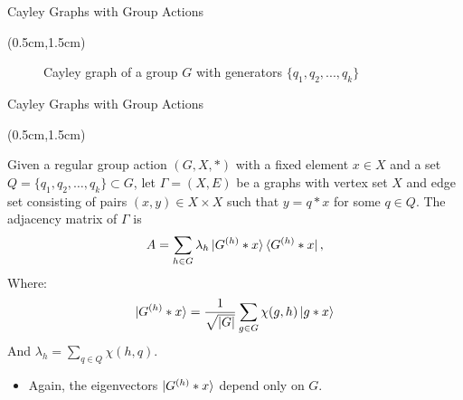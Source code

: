 \documentclass{beamer}
\theoremstyle{definition}
\begin{document}
\begin{frame}{Cayley Graphs with Group Actions}
    \begin{textblock*}{12cm}(0.5cm,1.5cm)


        \begin{figure}[H]
            \centering
            \caption{Cayley graph of a group $G$ with generators $\{q_1, q_2, ... , q_k\}$}

            \label{fig:group-action-orbit}
        \end{figure}
        
    
    \end{textblock*}
\end{frame}






\begin{frame}{Cayley Graphs with Group Actions}
    \begin{textblock*}{12cm}(0.5cm,1.5cm)

    
    Given a regular group action $(G, X, *)$ with a fixed element $x \in X$ and a set  $Q = \{q_1, q_2, \dots, q_k\} \subset G$, let $\Gamma = (X, E)$ be a graphs with vertex set $X$ and edge set consisting of pairs $(x, y) \in X \times X$ such that $y = q * x$ for some $q \in Q$. The adjacency matrix of $\Gamma$ is
    \[
    A = \sum_{h \in G} \lambda_h \ket{G^{(h)} * x} \bra{G^{(h)} * x}, 
    \]
    Where:
    \[
        \ket{G^{(h)} * x} = \frac{1}{\sqrt{|G|}}\sum_{g \in G}\chi(g,h)\ket{g*x}
    \]
    And $\lambda_h = \sum_{q \in Q} \chi(h, q)$. 
    \vspace{0.5cm}
    \begin{itemize}
        \item Again, the eigenvectors $\ket{G^{(h)} * x}$ depend only on $G$.
    \end{itemize}
    \end{textblock*}
\end{frame}
\end{document}
